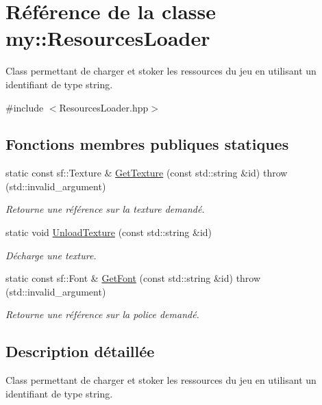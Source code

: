 \hypertarget{classmy_1_1ResourcesLoader}{}\section{Référence de la classe my\+:\+:Resources\+Loader}
\label{classmy_1_1ResourcesLoader}


Class permettant de charger et stoker les ressources du jeu en utilisant un identifiant de type string.  




{\ttfamily \#include $<$Resources\+Loader.\+hpp$>$}

\subsection*{Fonctions membres publiques statiques}
\begin{DoxyCompactItemize}
\item 
static const sf\+::\+Texture \& \hyperlink{classmy_1_1ResourcesLoader_a99c16ed7b9c9772e6181fd79b7417d87}{Get\+Texture} (const std\+::string \&id)  throw (std\+::invalid\+\_\+argument)
\begin{DoxyCompactList}\small\item\em Retourne une référence sur la texture demandé. \end{DoxyCompactList}\item 
static void \hyperlink{classmy_1_1ResourcesLoader_a546e03595e3740faed2223ed4b8f1fc2}{Unload\+Texture} (const std\+::string \&id)
\begin{DoxyCompactList}\small\item\em Décharge une texture. \end{DoxyCompactList}\item 
static const sf\+::\+Font \& \hyperlink{classmy_1_1ResourcesLoader_a3fd370dcde54accc2dfb22772c6370b6}{Get\+Font} (const std\+::string \&id)  throw (std\+::invalid\+\_\+argument)
\begin{DoxyCompactList}\small\item\em Retourne une référence sur la police demandé. \end{DoxyCompactList}\end{DoxyCompactItemize}


\subsection{Description détaillée}
Class permettant de charger et stoker les ressources du jeu en utilisant un identifiant de type string. 

